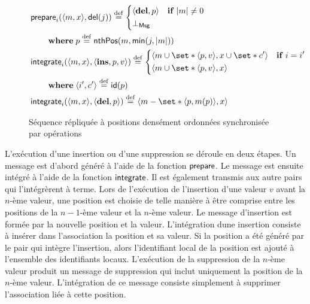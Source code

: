 \begin{figure}[htb]
\begin{align*}
%
&\begin{aligned}
\MoveEqLeft \trm{prepare}_i(\tuple*{m,x}, \trm{del}(j)) \defeq%
\begin{dcases}
\tuple*{\textbf{del}, p} & \when \card*{m} \neq 0\\
\bot_{\trm{Msg}} &
\end{dcases}\\
&\where p \defeq \trm{nthPos}(m, \trm{min}(j, \card*{m}))\\
\end{aligned}\\
%
&\begin{aligned}
\MoveEqLeft \trm{integrate}_i(\tuple*{m, x}, \tuple*{\textbf{ins}, p, v}) \defeq%
\begin{dcases}
    \tuple*{m \cup \set*{\tuple*{p, v}}, x \cup \set*{c'}} & \when i = i'\\
    \tuple*{m \cup \set*{\tuple*{p, v}}, x} &
\end{dcases}\\
&\where \tuple*{i', c'} \defeq \trm{id}(p)
\end{aligned}\\
%
&\trm{integrate}_i(\tuple*{m, x}, \tuple*{\textbf{del}, p}) \defeq%
\tuple*{m \sminus \set*{\tuple*{p, m(p)}}, x}
%
\end{align*}
\caption{Séquence répliquée à positions densément ordonnées synchronisée par opérations}\label{fig:op-densely-id-repseq}
\end{figure}

L'exécution d'une insertion ou d'une suppression se déroule en deux étapes.
Un message est d'abord généré à l'aide de la fonction $\operatorname{\mathsf{prepare}}$.
Le message est ensuite intégré à l'aide de la fonction $\operatorname{\mathsf{integrate}}$. Il est également transmis aux autre pairs qui l'intégrèrent à terme.
Lors de l'exécution de l'insertion d'une valeur $v$ avant la $n$-ème valeur, une position est choisie de telle manière à être comprise entre les positions de la $n-1$-ème valeur et la $n$-ème valeur.
Le message d'insertion est formée par la nouvelle position et la valeur.
L'intégration dune insertion consiste à insérer dans l'association la position et sa valeur.
Si la position a été généré par le pair qui intègre l'insertion, alors l'identifiant local de la position est ajouté à l'ensemble des identifiants locaux.
L'exécution de la suppression de la $n$-ème valeur produit un message de suppression qui inclut uniquement la position de la $n$-ème valeur.
L'intégration de ce message consiste simplement à supprimer l'association liée à cette position.

